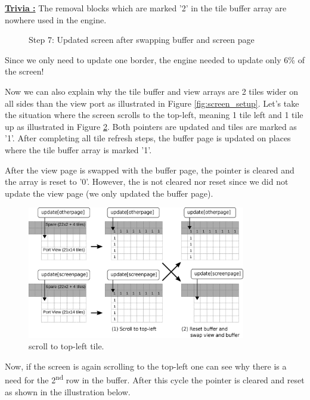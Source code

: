 \documentclass[book.tex]{subfiles}
\begin{document}
\par
\textbf{\underline{Trivia :}} The removal blocks which are marked '2' in the tile buffer array are nowhere used in the engine.\\
  \par
\pagebreak

\begin{figure}[H]
\centering
 \caption{Step 7: Updated screen after swapping buffer and screen page}
 \label{fig:k4_6_update_final}
\end{figure}


Since we only need to update one border, the engine needed to update only 6\% of the screen!\\


\par
\begin{minipage}{\textwidth}
  
\end{minipage}
\label{state_type}
\par

Now we can also explain why the tile buffer and view arrays are 2 tiles wider on all sides than the view port as illustrated in Figure \ref{fig:screen_setup}. Let's take the situation where the screen scrolls to the top-left, meaning 1 tile left and 1 tile up as illustrated in Figure \ref{fig:buffer_tile_move_1}. Both  pointers are updated and tiles are marked as '1'. After completing all tile refresh steps, the buffer page is updated on places where the tile buffer array is marked '1'. \\
\par
After the view page is swapped with the buffer page, the  pointer is cleared and the array is reset to '0'. However, the  is not cleared nor reset since we did not update the view page (we only updated the buffer page).\\
\begin{figure}[H]
  \centering
  \includegraphics[width=0.85\textwidth]{imgs/drawings/buffer_tile_move_1.eps}
  \caption{scroll to top-left tile.}
  \label{fig:buffer_tile_move_1}
\end{figure}
Now, if the screen is again scrolling to the top-left one can see why there is a need for the 2\textsuperscript{nd} row in the buffer. After this cycle the  pointer is cleared and reset as shown in the illustration below.\\
\end{document}
